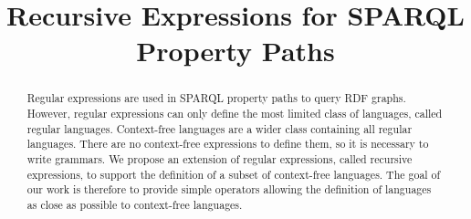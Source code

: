 \documentclass[runningheads]{llncs}
\begin{document}
%
\title{Recursive Expressions for SPARQL Property Paths}
%
%






\maketitle              %
%
\begin{abstract}
Regular expressions are used in SPARQL property paths to query RDF graphs.
However, regular expressions can only define the most limited class of languages, called regular languages.
Context-free languages are a wider class containing all regular languages.
There are no context-free expressions to define them, so it is necessary to write grammars.
We propose an extension of regular expressions, called recursive expressions, to support the definition of a subset of context-free languages.
The goal of our work is therefore to provide simple operators allowing the definition of languages as close as possible to context-free languages.
\end{abstract}
%
%
%
\end{document}
